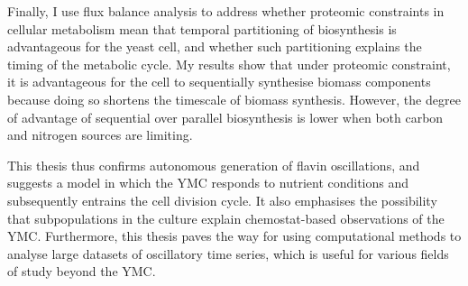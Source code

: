 {  Finally, I use flux balance analysis to address whether proteomic constraints in cellular metabolism mean that temporal partitioning of biosynthesis is advantageous for the yeast cell, and whether such partitioning explains the timing of the metabolic cycle.
  My results show that under proteomic constraint, it is advantageous for the cell to sequentially synthesise biomass components because doing so shortens the timescale of biomass synthesis.
  However, the degree of advantage of sequential over parallel biosynthesis is lower when both carbon and nitrogen sources are limiting.

  This thesis thus confirms autonomous generation of flavin oscillations, and suggests a model in which the YMC responds to nutrient conditions and subsequently entrains the cell division cycle.
  It also emphasises the possibility that subpopulations in the culture explain chemostat-based observations of the YMC\@.
  Furthermore, this thesis paves the way for using computational methods to analyse large datasets of oscillatory time series, which is useful for various fields of study beyond the YMC\@.
}


